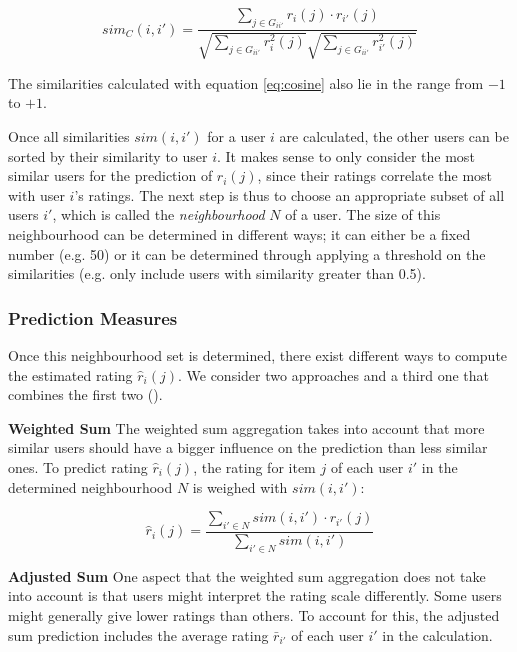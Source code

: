 \begin{equation}
sim_C(i,i') = \frac{\sum_{j \in G_{ii'}}{r_{i}(j)\cdot r_{i'}(j)}}{\sqrt{\sum_{j \in G_{ii'}}{{r_{i}^2}(j)}}\sqrt{\sum_{j \in G_{ii'}}{{r_{i'}^2}(j)}}}
\label{eq:cosine}
\end{equation}

The similarities calculated with equation \eqref{eq:cosine} also lie in the range from $-1$ to $+1$.
\newline

Once all similarities $sim(i,i')$ for a user $i$ are calculated, the other users can be sorted by their similarity to user $i$. It makes sense to only consider the most similar users for the prediction of $\hat{r}_i(j)$, since their ratings correlate the most with user $i$'s ratings. The next step is thus to choose an appropriate subset of all users $i'$, which is called the \textit{neighbourhood} $N$ of a user. The size of this neighbourhood can be determined in different ways; it can either be a fixed number (e.g. 50) or it can be determined through applying a threshold on the similarities (e.g. only include users with similarity greater than 0.5).

\subsubsection{Prediction Measures}
\label{ssst:predictionmeasures} Once this neighbourhood set is determined, there exist different ways to compute the estimated rating $\hat{r}_i(j)$. We consider two approaches and a third one that combines the first two (\cite{Parkes_2013}).
\newline

\textbf{Weighted Sum} The weighted sum aggregation takes into account that more similar users should have a bigger influence on the prediction than less similar ones. To predict rating $\hat{r}_i(j)$, the rating for item $j$ of each user $i'$ in the determined neighbourhood $N$ is weighed with $sim(i,i')$:

\begin{equation}
\hat{r}_i(j) = \frac{\sum_{i' \in N}{sim(i,i')\cdot r_{i'}(j)}}{\sum_{i' \in N}{sim(i,i')}}
\label{eq:weightedsum}
\end{equation}
\newline

\textbf{Adjusted Sum} One aspect that the weighted sum aggregation does not take into account is that users might interpret the rating scale differently. Some users might generally give lower ratings than others. To account for this, the adjusted sum prediction includes the average rating $\bar{r}_{i'}$ of each user $i'$ in the calculation.

